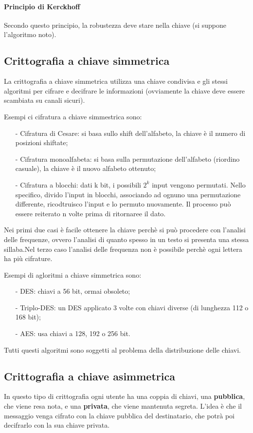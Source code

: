 \documentclass[a4paper, 10pt]{report}
\begin{document}
\paragraph*{Principio di Kerckhoff} Secondo questo principio, la robustezza deve stare nella chiave (si suppone l'algoritmo noto).
		
		\subsection{Crittografia a chiave simmetrica}
		La crittografia a chiave simmetrica utilizza una chiave condivisa e gli stessi algoritmi per cifrare e decifrare le informazioni (ovviamente la chiave deve essere scambiata su canali sicuri).

\noindent Esempi ci cifratura a chiave simmestrica sono:
\begin{itemize}
\item[-] Cifratura di Cesare: si basa sullo shift dell'alfabeto, la chiave è il numero di posizioni shiftate;
\item[-] Cifratura monoalfabeta: si basa sulla permutazione dell'alfabeto (riordino casuale), la chiave è il nuovo alfabeto ottenuto;
\item[-] Cifratura a blocchi: dati k bit, i possibili $2^k$ input vengono permutati. Nello specifico, divido l'input in blocchi, associando ad ognuno una permutazione differente, ricodtruisco l'input e lo permuto nuovamente. Il processo può essere reiterato n volte prima di ritornaree il dato.
\end{itemize}
\noindent Nei primi due casi è facile ottenere la chiave perchè si può procedere con l'analisi delle frequenze, ovvero l'analisi di quanto spesso in un testo si presenta una stessa sillaba.Nel terzo caso l'analisi delle frequenza non è possibile perchè ogni lettera ha più cifrature.
		
\noindent Esempi di agloritmi a chiave simmetrica sono:
		\begin{itemize}
			\item[-] DES: chiavi a 56 bit, ormai obsoleto;
			\item[-] Triplo-DES: un DES applicato 3 volte con chiavi diverse (di lunghezza 112 o 168 bit);
			\item[-] AES: usa chiavi a 128, 192 o 256 bit.
		\end{itemize}
	
\noindent Tutti questi algoritmi sono soggetti al problema della distribuzione delle chiavi. 
		
\subsection{Crittografia a chiave asimmetrica}
In questo tipo di crittografia ogni utente ha una coppia di chiavi, una \textbf{pubblica}, che viene resa nota, e una \textbf{privata}, che viene mantenuta segreta. L'idea è che il messaggio venga cifrato con la chiave pubblica del destinatario, che potrà poi decifrarlo con la sua chiave privata.
		
\end{document}

